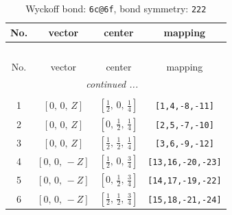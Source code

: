 \documentclass[fleqn,8pt]{jsarticle}
\begin{document}
\begin{longtable}{cccc}
\caption{Wyckoff bond: {\tt 6c@6f}, bond symmetry: {\tt 222}}
 \\
 \hline \hline
No. & vector & center & mapping \\ \hline \endfirsthead

\multicolumn{3}{l}{\tablename\ \thetable{}} \\
 \hline \hline
No. & vector & center & mapping \\ \hline \endhead

 \hline \hline
\multicolumn{3}{r}{\footnotesize\it continued ...} \\ \endfoot

 \hline \hline
\multicolumn{3}{r}{} \\ \endlastfoot

1 & $\left[ 0,\, 0,\, Z \right]$ & $\left[ \frac{1}{2},\, 0,\, \frac{1}{4} \right]$ & {\tt [1,4,-8,-11]} \\ \hline
2 & $\left[ 0,\, 0,\, Z \right]$ & $\left[ 0,\, \frac{1}{2},\, \frac{1}{4} \right]$ & {\tt [2,5,-7,-10]} \\ \hline
3 & $\left[ 0,\, 0,\, Z \right]$ & $\left[ \frac{1}{2},\, \frac{1}{2},\, \frac{1}{4} \right]$ & {\tt [3,6,-9,-12]} \\ \hline
4 & $\left[ 0,\, 0,\, - Z \right]$ & $\left[ \frac{1}{2},\, 0,\, \frac{3}{4} \right]$ & {\tt [13,16,-20,-23]} \\ \hline
5 & $\left[ 0,\, 0,\, - Z \right]$ & $\left[ 0,\, \frac{1}{2},\, \frac{3}{4} \right]$ & {\tt [14,17,-19,-22]} \\ \hline
6 & $\left[ 0,\, 0,\, - Z \right]$ & $\left[ \frac{1}{2},\, \frac{1}{2},\, \frac{3}{4} \right]$ & {\tt [15,18,-21,-24]} \\
\end{longtable}
\renewcommand{\arraystretch}{1.2}
\end{document}
